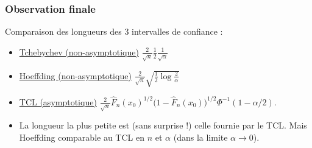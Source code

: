 \begin{frame}
\frametitle{Observation finale}
Comparaison des longueurs des 3 intervalles de confiance :
\begin{itemize}
\item \underline{Tchebychev (non-asymptotique)}
$\frac{2}{\sqrt{n}} \frac{1}{2} \frac{1}{\sqrt{\alpha}}$
\item \underline{\alert{Hoeffding (non-asymptotique)}}
$\frac{2}{\sqrt{n}} \sqrt{\frac{1}{2}\log \frac{2}{\alpha}}$
\item \underline{TCL (asymptotique)}
$\frac{2}{\sqrt{n}} \widehat F_n(x_0)^{1/2}\big(1-\widehat F_n(x_0)\big)^{1/2} \Phi^{-1}(1-\alpha/2).$
\item La longueur la plus petite est (\alert{sans surprise !}) celle fournie par le TCL. Mais
Hoeffding \alert{comparable} au TCL en $n$ et $\alpha$ (dans la limite $\alpha\rightarrow 0$).
\end{itemize}
\end{frame}
